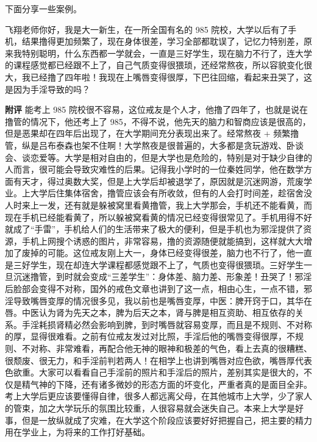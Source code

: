 下面分享一些案例。

\begin{case}
    飞翔老师你好，我是大一新生，在一所全国有名的 985 院校，大学以后有了手机，结果撸得更加频繁了，现在身体很差，学习全部都耽误了，记忆力特别差，原来我特别聪明，什么东西都一学就会，一直是三好学生，现在脑力不行了，连大学的课程感觉都已经跟不上了，自己气质变得很猥琐，还经常熬夜，所以容貌变化很大，我已经撸了四年啦！我现在上嘴唇变得很厚，下巴往回缩，看起来丑哭了，这是因为手淫导致的吗？

    \textbf{附评} 能考上 985 院校很不容易，这位戒友是个人才，他撸了四年了，也就是说在撸管的情况下，他还考上了 985，不得不说，他先天的脑力和智商应该是很高的，但是恶果却在四年后出现了，在大学期间充分表现出来了。经常熬夜 + 频繁撸管，纵是吕布泰森也架不住啊！大学熬夜是很普遍的，大多都是贪玩游戏、卧谈会、谈恋爱等。大学是相对自由的，但是大学也是危险的，特别是对于缺少自律的人而言，很可能会导致灾难性的后果。记得我小学时的一位秦姓同学，他在数学方面有天才，得过奥数大奖，但是上大学后却被退学了，原因就是沉迷网游，荒废学业。上大学后住集体宿舍，撸管应该会有所收敛，但有的人会打时间差，趁宿舍没人时来上一发，还有就是躲被窝里看黄撸管，我上大学那会，手机还不能看黄，而现在手机已经能看黄了，所以躲被窝看黄的情况已经变得很常见了。手机用得不好就成了“手雷”，手机给人们的生活带来了极大的便利，但是手机也为邪淫提供了资源，手机上网搜个诱惑的图片，非常容易，撸的资源随便就能搞到，这样就大大增加了废掉的可能。这位戒友刚上大一，身体已经变得很差，脑力也不行了，他一直是三好学生，现在却连大学课程都感觉跟不上了，气质也变得很猥琐。三好学生一旦沉迷撸管，到时就会变成“三差学生”：身体差、脑力差、形象差！丑哭了！邪淫后脸部会变得不对称，国外的戒色文章也讲到了这一点，相由心生，一点不错，邪淫导致嘴唇变厚的情况很多见，我以前也是嘴唇变厚，中医：脾开窍于口，其华在唇。中医认为肾为先天之本，脾为后天之本，肾与脾是相互资助、相互依存的关系。手淫耗损肾精必然会影响到脾，到时嘴唇就容易变厚，而且是不规则、不对称的厚，显得很难看。之前有位戒友发过对比照，手淫后他的嘴唇变得很厚，不规则、不对称、非常难看，再配合他无神的眼神和极差的气色，看上去真的很糟糕、很颓废、很无力，和手淫前判若两人！在相学上也讲到嘴唇对应色欲，嘴唇厚代表色欲重。大家可以看看自己手淫前的照片和手淫后的照片，差别其实是很大的，不仅是精气神的下降，还有诸多微妙的形态方面的坏变化，严重者真的是面目全非。考上大学后更应该要懂得自律，很多人都远离父母，在其他城市上大学，少了家人的管束，加之大学玩乐的氛围比较重，人很容易就会迷失自己。本来上大学是好事，但是一放纵就成了灾难，在大学这个阶段应该要好好把握自己，把主要的精力用在学业上，为将来的工作打好基础。
\end{case}

